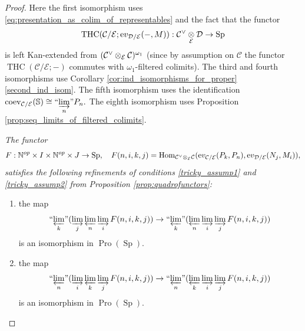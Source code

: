 \documentclass[11pt,leqno]{amsart}
\numberwithin{equation}{section}
\def\N{\mathbb{N}}
\def\bS{\mathbb{S}}
\def\Hom{\operatorname{Hom}}
\newcommand{\tens}[1]{%
  \mathbin{\mathop{\otimes}\displaylimits_{#1}}%
}
\newcommand{\indlim}[1][]{\mathop{\varinjlim}\limits_{#1}}
\newcommand{\inddlim}[1][]{{``{\indlim[#1]}"}}
\newcommand{\prolim}[1][]{\mathop{\varprojlim}\limits_{#1}}
\newcommand{\proolim}[1][]{{``{\prolim[#1]}"}}
\newcommand{\ev}{\mathrm ev}
\newcommand{\cD}{{\mathcal D}}
\newcommand{\cC}{{\mathcal C}}
\newcommand{\cE}{{\mathcal E}}
\newcommand{\THC}{\operatorname{THC}}
\newcommand{\Sp}{\operatorname{Sp}}
\newcommand{\Pro}{\operatorname{Pro}}
\newcommand{\coev}{\operatorname{coev}}
\begin{document}
\begin{proof}
Here the first isomorphism uses \eqref{eq:presentation_as_colim_of_representables} and the fact that the functor
$$\THC(\cC/\cE;\ev_{\cD/\cE}(-,M)):\cC^{\vee}\tens{\cE}\cD\to\Sp$$ is left Kan-extended from $(\cC^{\vee}\tens{\cE}\cC)^{\omega_1}$ (since by assumption on $\cC$ the functor $\THC(\cC/\cE;-)$ commutes with $\omega_1$-filtered colimits). The third and fourth isomorphisms use Corollary \ref{cor:ind_isomorphisms_for_proper} \ref{second_ind_isom}. The fifth isomorphism uses the identification $\coev_{\cC/\cE}(\bS)\cong \inddlim[n]P_n.$ The eighth isomorphism uses Proposition \ref{prop:seq_limits_of_filtered_colimits}.

{} {\it The functor
\begin{equation}\label{eq:key_quadrofunctor_for_Hom^dual}
	F:\N^{op}\times I\times \N^{op}\times J\to\Sp,\quad F(n,i,k,j)=\Hom_{\cC^{\vee}\tens{\cE}\cC}(\ev_{\cC/\cE}(P_k,P_n),\ev_{\cD/\cE}(N_j,M_i)),
	\end{equation}
satisfies the following refinements of conditions \ref{tricky_assump1} and \ref{tricky_assump2} from Proposition \ref{prop:quadrofunctors}:
\begin{enumerate}[label=(\roman*),ref=(\roman*)]
	\item the map \begin{equation}\label{eq:maps_of_proobjects}
		\proolim[k](\indlim[j]\prolim[n]\indlim[i]F(n,i,k,j))\to \proolim[k](\prolim[n]\indlim[i]\indlim[j]F(n,i,k,j))\end{equation}
	is an isomorphism in $\Pro(\Sp).$ \label{refined_assump1}
	
	\item the map  \begin{equation*}\proolim[n](\indlim[i]\prolim[k]\indlim[j]F(n,i,k,j))\to \proolim[n](\prolim[k]\indlim[i]\indlim[j]F(n,i,k,j))\end{equation*}
is an isomorphism in $\Pro(\Sp).$ \label{refined_assump2}
\end{enumerate} 
}


\end{proof}
\end{document}
